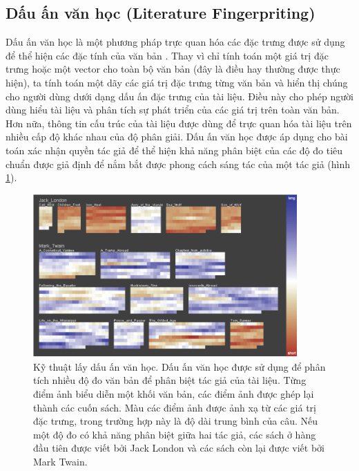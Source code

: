 \documentclass[14pt, a4paper]{article}
\numberwithin{equation}{section}
\numberwithin{figure}{section}
\numberwithin{dl}{section}
\numberwithin{md}{section}
\numberwithin{bd}{section}
\numberwithin{dn}{section}
\numberwithin{hq}{section}
\begin{document}
    \subsection{Dấu ấn văn học (Literature Fingerpriting)}


    Dấu ấn văn học là một phương pháp trực quan hóa các đặc trưng được sử dụng để thể hiện các đặc tính của văn bản \cite{222}.
    Thay vì chỉ tính toán một giá trị đặc trưng hoặc một vector cho toàn bộ văn bản (đây là điều hay thường được thực hiện), ta tính toán một dãy các giá trị đặc trưng từng văn bản và hiển thị chúng cho người dùng dưới dạng dấu ấn đặc trưng của tài liệu.
    Điều này cho phép người dùng hiểu tài liệu và phân tích sự phát triển của các giá trị trên toàn văn bản.
    Hơn nữa, thông tin cấu trúc của tài liệu được dùng để trực quan hóa tài liệu trên nhiều cấp độ khác nhau của độ phân giải.
    Dấu ấn văn học được áp dụng cho bài toán xác nhận quyền tác giả để thể hiện khả năng phân biệt của các độ đo tiêu chuẩn được giả định để nắm bắt được phong cách sáng tác của một tác giả (hình \ref{fig:9}).

    \begin{figure}[h!]
        \centering
        \includegraphics[width=0.9\textwidth]{9.png}
        \caption{Kỹ thuật lấy dấu ấn văn học. Dấu ấn văn học được sử dụng để phân tích nhiều độ đo văn bản để phân biệt tác giả của tài liệu.
        Từng điểm ảnh biểu diễn một khối văn bản, các điểm ảnh được ghép lại thành các cuốn sách.
        Màu các điểm ảnh được ảnh xạ từ các giá trị đặc trưng, trong trường hợp này là độ dài trung bình của câu.
        Nếu một độ đo có khả năng phân biệt giữa hai tác giả, các sách ở hàng đầu tiên được viết bởi Jack London và các sách còn lại được viết bởi Mark Twain. \cite{222}}
        \label{fig:9}
    \end{figure}

    \newpage
    
    \printbibliography[title={TÀI LIỆU THAM KHẢO}]
\end{document}

